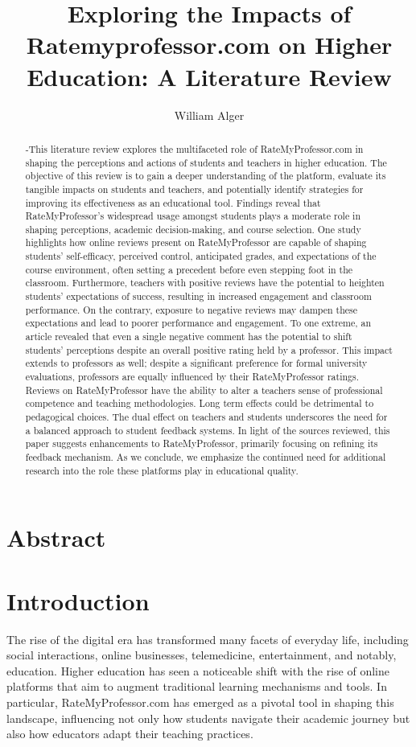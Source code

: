 \documentclass[twocolumn, doc,12pt]{apa7}
\title{Exploring the Impacts of Ratemyprofessor.com on Higher Education: A Literature Review}
\author{William Alger}
\affiliation{Northern Kentucky University}
\begin{document}
\maketitle

\section{Abstract}
\begin{abstract}
-This literature review explores the multifaceted role of RateMyProfessor.com in shaping the perceptions and actions of students and teachers in higher education. 
The objective of this review is to gain a deeper understanding of the platform, evaluate its tangible impacts on students and teachers, and potentially identify strategies for improving its effectiveness as an educational tool. Findings reveal that RateMyProfessor's widespread usage amongst students plays a moderate role in shaping perceptions, academic decision-making, and course selection. One study highlights how online reviews present on RateMyProfessor are capable of shaping students' self-efficacy, perceived control, anticipated grades, and expectations of the course environment, often setting a precedent before even stepping foot in the classroom. Furthermore, teachers with positive reviews have the potential to heighten students' expectations of success, resulting in increased engagement and classroom performance. On the contrary, exposure to negative reviews may dampen these expectations and lead to poorer performance and engagement. To one extreme, an article revealed that even a single negative comment has the potential to shift students' perceptions despite an overall positive rating held by a professor. This impact extends to professors as well; despite a significant preference for formal university evaluations, professors are equally influenced by their RateMyProfessor ratings. Reviews on RateMyProfessor have the ability to alter a teachers sense of professional competence and teaching methodologies. Long term effects could be detrimental to pedagogical choices. The dual effect on teachers and students underscores the need for a balanced approach to student feedback systems. In light of the sources reviewed, this paper suggests enhancements to RateMyProfessor, primarily focusing on refining its feedback mechanism. As we conclude, we emphasize the continued need for additional research into the role these platforms play in educational quality.
\end{abstract}

\section{Introduction}
The rise of the digital era has transformed many facets of everyday life, including social interactions, online businesses, telemedicine, entertainment, and notably, education. Higher education has seen a noticeable shift with the rise of online platforms that aim to augment traditional learning mechanisms and tools. In particular, RateMyProfessor.com has emerged as a pivotal tool in shaping this landscape, influencing not only how students navigate their academic journey but also how educators adapt their teaching practices.
\end{document}
